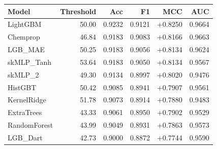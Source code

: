 \begin{tabular}{lrrrrr}
\toprule
Model & Threshold & Acc & F1 & MCC & AUC \\
\midrule
LightGBM & 50.00 & 0.9232 & 0.9121 & +0.8250 & 0.9664 \\
Chemprop & 46.84 & 0.9183 & 0.9083 & +0.8166 & 0.9663 \\
LGB\_MAE & 50.25 & 0.9183 & 0.9056 & +0.8134 & 0.9624 \\
skMLP\_Tanh & 53.64 & 0.9183 & 0.9050 & +0.8134 & 0.9567 \\
skMLP\_2 & 49.30 & 0.9134 & 0.8997 & +0.8020 & 0.9476 \\
HistGBT & 50.42 & 0.9085 & 0.8941 & +0.7907 & 0.9561 \\
KernelRidge & 51.78 & 0.9073 & 0.8914 & +0.7880 & 0.9483 \\
ExtraTrees & 43.33 & 0.9061 & 0.8950 & +0.7902 & 0.9529 \\
RandomForest & 43.99 & 0.9049 & 0.8931 & +0.7863 & 0.9573 \\
LGB\_Dart & 42.73 & 0.9000 & 0.8872 & +0.7744 & 0.9590 \\
\bottomrule
\end{tabular}